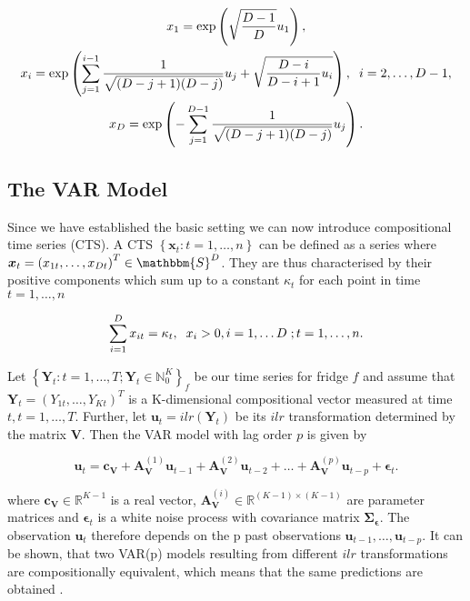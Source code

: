 \begin{gather*}
x_1 = \exp\left(\sqrt{\frac{D-1}{D}}u_1\right), \\
x_i = \exp\left( \sum_{j=1}^{i-1}\frac{1}{\sqrt{(D-j+1)(D-j)}}u_j + \sqrt{\frac{D-i}{D-i+1}u_i} \right), \hspace{0.2cm} i=2,\ldots, D-1, \\
x_D = \exp\left(- \sum_{j=1}^{D-1} \frac{1}{\sqrt{(D-j+1)(D-j)}}u_j \right).
\label{eq: Inverse Transformation}
\end{gather*}


\subsection{The VAR Model}
\label{sec:The VAR Model}

Since we have established the basic setting we can now introduce compositional time series (CTS). A CTS $\left\{\bm{x}_t:t=1,\ldots,n \right\}$ can be defined as a series where $\bm{x}_t = \left(x_{1t},\ldots,x_{Dt}\right)^T \in \mathbbm{S}^D$. They are thus characterised by their positive components which sum up to a constant $\kappa_t$ for each point in time $t=1,\ldots,n$ 

\begin{equation*}
\sum_{i=1}^D x_{it} = \kappa_t, \hspace{0.2cm} x_i > 0, i=1,\ldots D \hspace{0.1cm}; t=1,\ldots, n. 
\label{eq:CTS characterisation}
\end{equation*} 

Let $\left\{\bm{Y}_t:t=1,\ldots,T; \bm{Y}_t \in \mathbb{N}_0^K \right\}_f$ be our time series for fridge $f$ and assume that $\bm{Y}_t=(Y_{1t},\ldots,Y_{Kt})^T$ is a K-dimensional compositional vector measured at time $t, t=1,\ldots,T$. Further, let $\textbf{u}_t = ilr(\bm{Y}_t)$ be its $ilr$ transformation determined by the matrix $\textbf{V}$. Then the VAR model with lag order $p$ is given by \cite{Kynclova:2015}

\begin{equation}
\textbf{u}_t = \textbf{c}_{\textbf{V}} + \textbf{A}_{\textbf{V}}^{(1)}\textbf{u}_{t-1} + \textbf{A}_{\textbf{V}}^{(2)}\textbf{u}_{t-2} + \ldots + \textbf{A}_{\textbf{V}}^{(p)}\textbf{u}_{t-p} + \bm{\epsilon}_{t}.
\label{eq:VAR model}
\end{equation}

where $\textbf{c}_{\textbf{V}} \in \mathbb{R}^{K-1}$ is a real vector, $\textbf{A}_{\textbf{V}}^{(i)} \in \mathbb{R}^{(K-1) \times (K-1)}$ are parameter matrices and $\bm{\epsilon}_t$ is a white noise process with covariance matrix $\bm{\Sigma_\epsilon}$. The observation $\textbf{u}_t$ therefore depends on the p past observations $\textbf{u}_{t-1},\ldots,\textbf{u}_{t-p}$. It can be shown, that two VAR(p) models resulting from different $ilr$ transformations are compositionally equivalent, which means that the same predictions are obtained \cite{Kynclova:2015}. 


